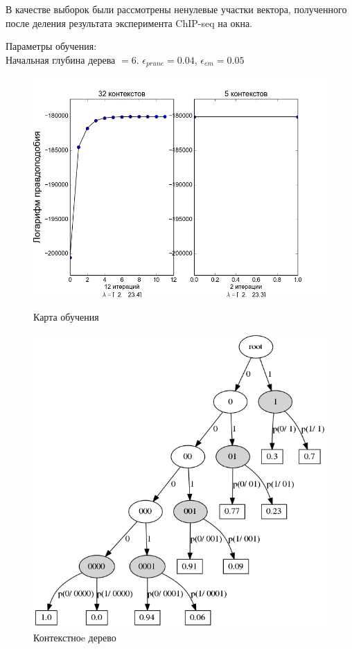 \documentclass{matmex-diploma-custom}
\begin{document}
В качестве выборок были рассмотрены ненулевые участки вектора, полученного после деления результата эксперимента ChIP-seq на окна. 

Параметры обучения:\\
Начальная глубина дерева $= 6 $.
$\epsilon_{prune} = 0.04$,
$\epsilon_{em} = 0.05$
\begin{figure}[h!]\centering
\begin{minipage}[b]{0.49 \textwidth}
	\includegraphics[scale=0.47]{img/real/plot_.png}
	\centering
	\caption{ Карта обучения }
	\label{ris:log_likelihood}
\end{minipage}
\hfill
\begin{minipage}[b]{0.32 \textwidth}
	\includegraphics[scale=0.29]{img/real/predicted_trie.png}
	\centering
	\caption{ Контекстноe дерево }
	\label{ris:real_trie}
\end{minipage}
\end{figure}
\end{document}
